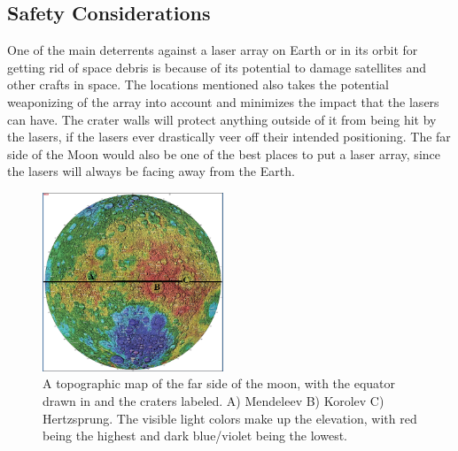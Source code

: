 \documentclass{aa}
\begin{document}
\subsection{Safety Considerations}
One of the main deterrents against a laser array on Earth or in its orbit for getting rid of space debris is because of its potential to damage satellites and other crafts in space. The locations mentioned also takes the potential weaponizing of the array into account and minimizes the impact that the lasers can have. The crater walls will protect anything outside of it from being hit by the lasers, if the lasers ever drastically veer off their intended positioning. The far side of the Moon would also be one of the best places to put a laser array, since the lasers will always be facing away from the Earth.
\begin{figure}[h!]
  \caption{A topographic map of the far side of the moon, with the equator drawn in and the craters labeled. A) Mendeleev B) Korolev C) Hertzsprung. The visible light colors make up the elevation, with red being the highest and dark blue/violet being the lowest.}
\includegraphics[width=0.48\textwidth]{Topographic_Map_of_the_Moon_s_Far_Side.png}
\end{figure}





\end{document}
